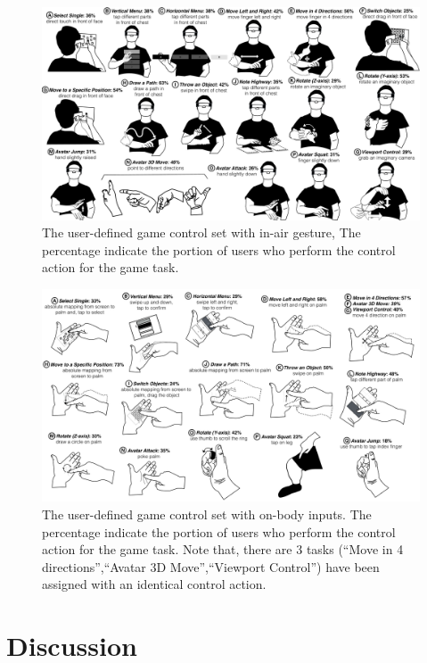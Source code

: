 \documentclass{sigchi}
\begin{document}
  \begin{figure}
  \centering
  \includegraphics[width=1\textwidth]{InAirSet.pdf}
  \caption{The user-defined game control set with in-air gesture, The percentage indicate the portion of users who perform the control action for the game task.}
  \label{fig:InAirSet}
  \end{figure}


  \begin{figure}
  \centering
  \includegraphics[width=1\textwidth]{OnBodyInputSet.pdf}
  \caption{The user-defined game control set with on-body inputs. The percentage indicate the portion of users who perform the control action for the game task. Note that, there are 3 tasks (``Move in 4 directions'',``Avatar 3D Move'',``Viewport Control'') have been assigned with an identical control action.}
  \label{fig:OnBodyInputSet}
  \end{figure}


  \section{Discussion}
\end{document}
